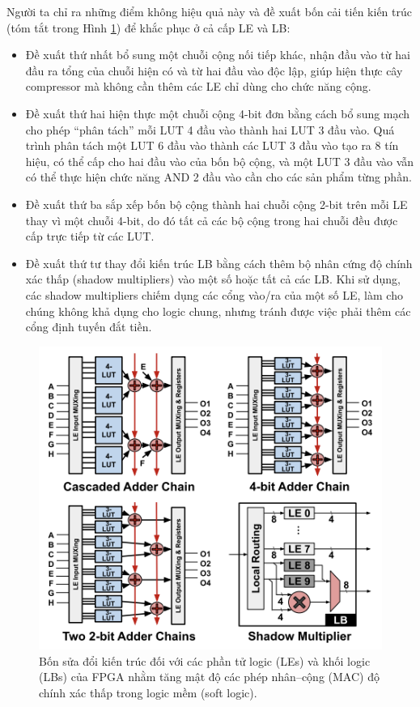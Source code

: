 \documentclass[a4paper]{article}
\begin{document}
Người ta chỉ ra những điểm không hiệu quả này và đề xuất bốn cải tiến kiến trúc (tóm tắt trong Hình \ref{fig:fpga_13}) để khắc phục ở cả cấp LE và LB:
\begin{itemize}
    \item Đề xuất thứ nhất bổ sung một chuỗi cộng nối tiếp khác, nhận đầu vào từ hai đầu ra tổng của chuỗi hiện có và từ hai đầu vào độc lập, giúp hiện thực cây compressor mà không cần thêm các LE chỉ dùng cho chức năng cộng.
    \item Đề xuất thứ hai hiện thực một chuỗi cộng 4-bit đơn bằng cách bổ sung mạch cho phép “phân tách” mỗi LUT 4 đầu vào thành hai LUT 3 đầu vào. Quá trình phân tách một LUT 6 đầu vào thành các LUT 3 đầu vào tạo ra 8 tín hiệu, có thể cấp cho hai đầu vào của bốn bộ cộng, và một LUT 3 đầu vào vẫn có thể thực hiện chức năng AND 2 đầu vào cần cho các sản phẩm từng phần.
    \item Đề xuất thứ ba sắp xếp bốn bộ cộng thành hai chuỗi cộng 2-bit trên mỗi LE thay vì một chuỗi 4-bit, do đó tất cả các bộ cộng trong hai chuỗi đều được cấp trực tiếp từ các LUT.
    \item Đề xuất thứ tư thay đổi kiến trúc LB bằng cách thêm bộ nhân cứng độ chính xác thấp (shadow multipliers) vào một số hoặc tất cả các LB. Khi sử dụng, các shadow multipliers chiếm dụng các cổng vào/ra của một số LE, làm cho chúng không khả dụng cho logic chung, nhưng tránh được việc phải thêm các cổng định tuyến đắt tiền.
\end{itemize}
\begin{figure} [!h]
    \centering
    \includegraphics[width=0.75\linewidth]{assets/fpga_13.png}
    \caption{Bốn sửa đổi kiến trúc đối với các phần tử logic (LEs) và khối logic (LBs) của FPGA nhằm tăng mật độ các phép nhân–cộng (MAC) độ chính xác thấp trong logic mềm (soft logic).}
    \label{fig:fpga_13}
\end{figure}
\end{document}
